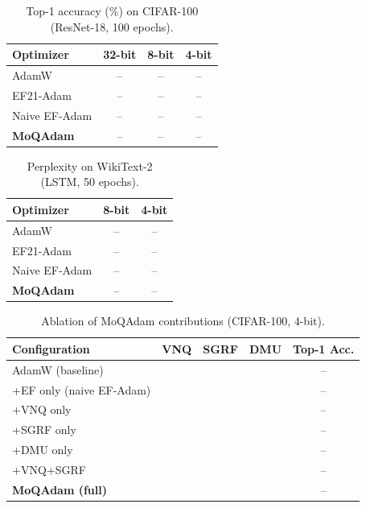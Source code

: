 \documentclass[10pt,twocolumn]{article}
\newcommand{\cmark}{\ding{51}}
\newcommand{\xmark}{\ding{55}}
\begin{document}
\begin{table}[h]
\centering
\caption{Top-1 accuracy (\%) on CIFAR-100 (ResNet-18, 100 epochs).}
\label{tab:cifar}
\begin{tabular}{lccc}
\toprule
\textbf{Optimizer} & \textbf{32-bit} & \textbf{8-bit} & \textbf{4-bit} \\
\midrule
AdamW                & --   & --   & -- \\
EF21-Adam            & --   & --   & -- \\
Naive EF-Adam        & --   & --   & -- \\
\textbf{MoQAdam}     & --   & --   & -- \\
\bottomrule
\end{tabular}
\end{table}

\begin{table}[h]
\centering
\caption{Perplexity on WikiText-2 (LSTM, 50 epochs).}
\label{tab:lm}
\begin{tabular}{lcc}
\toprule
\textbf{Optimizer} & \textbf{8-bit} & \textbf{4-bit} \\
\midrule
AdamW                & --   & -- \\
EF21-Adam            & --   & -- \\
Naive EF-Adam        & --   & -- \\
\textbf{MoQAdam}     & --   & -- \\
\bottomrule
\end{tabular}
\end{table}

\begin{table}[h]
\centering
\caption{Ablation of MoQAdam contributions (CIFAR-100, 4-bit).}
\label{tab:ablation}
\begin{tabular}{lcccc}
\toprule
\textbf{Configuration} & \textbf{VNQ} & \textbf{SGRF} & \textbf{DMU}
  & \textbf{Top-1 Acc.} \\
\midrule
AdamW (baseline)              & \xmark & \xmark & \xmark & -- \\
+EF only (naive EF-Adam)      & \xmark & \xmark & \xmark & -- \\
+VNQ only                     & \cmark & \xmark & \xmark & -- \\
+SGRF only                    & \xmark & \cmark & \xmark & -- \\
+DMU only                     & \xmark & \xmark & \cmark & -- \\
+VNQ+SGRF                     & \cmark & \cmark & \xmark & -- \\
\textbf{MoQAdam (full)}       & \cmark & \cmark & \cmark & -- \\
\bottomrule
\end{tabular}
\end{table}
\end{document}
